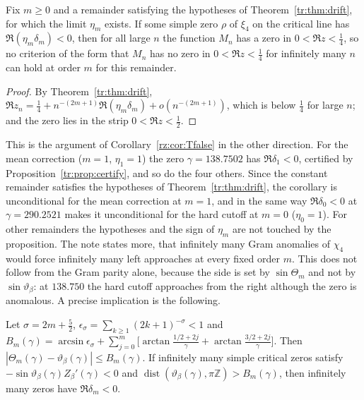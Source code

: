 \begin{corollary}\label{tr:cor:nogo}
Fix $m\ge0$ and a remainder satisfying the hypotheses of Theorem~\ref{tr:thm:drift}, for which the limit $\eta_m$ exists. If some simple zero $\rho$ of $\xi_4$ on the critical line has $\Re(\eta_m\delta_m)<0$, then for all large $n$ the function $M_n$ has a zero in $0<\Re z<\frac14$, so no criterion of the form that $M_n$ has no zero in $0<\Re z<\frac14$ for infinitely many $n$ can hold at order $m$ for this remainder.
\end{corollary}

\begin{proof}
By Theorem~\ref{tr:thm:drift}, $\Re z_n=\frac14+n^{-(2m+1)}\Re(\eta_m\delta_m)+o(n^{-(2m+1)})$, which is below $\frac14$ for large $n$; and the zero lies in the strip $0<\Re z<\frac12$.
\end{proof}

This is the argument of Corollary~\ref{rz:cor:Tfalse} in the other direction. For the mean correction ($m=1$, $\eta_1=1$) the zero $\gamma=138.7502$ has $\Re\delta_1<0$, certified by Proposition~\ref{tr:prop:certify}, and so do the four others. Since the constant remainder satisfies the hypotheses of Theorem~\ref{tr:thm:drift}, the corollary is unconditional for the mean correction at $m=1$, and in the same way $\Re\delta_0<0$ at $\gamma=290.2521$ makes it unconditional for the hard cutoff at $m=0$ ($\eta_0=1$). For other remainders the hypotheses and the sign of $\eta_m$ are not touched by the proposition. The note states more, that infinitely many Gram anomalies of $\chi_4$ would force infinitely many left approaches at every fixed order $m$. This does not follow from the Gram parity alone, because the side is set by $\sin\Theta_m$ and not by $\sin\vartheta_\beta$: at $138.750$ the hard cutoff approaches from the right although the zero is anomalous. A precise implication is the following.

\begin{proposition}\label{tr:prop:gram}
Let $\sigma=2m+\frac52$, $\epsilon_\sigma=\sum_{k\ge1}(2k+1)^{-\sigma}<1$ and $B_m(\gamma)=\arcsin\epsilon_\sigma+\sum_{j=0}^m\big[\arctan\frac{1/2+2j}\gamma+\arctan\frac{3/2+2j}\gamma\big]$. Then $|\Theta_m(\gamma)-\vartheta_\beta(\gamma)|\le B_m(\gamma)$. If infinitely many simple critical zeros satisfy $-\sin\vartheta_\beta(\gamma)Z_\beta'(\gamma)<0$ and $\operatorname{dist}(\vartheta_\beta(\gamma),\pi\mathbb Z)>B_m(\gamma)$, then infinitely many zeros have $\Re\delta_m<0$.
\end{proposition}

